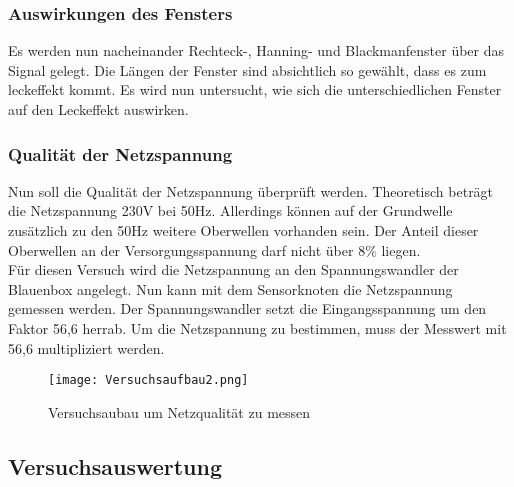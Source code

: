 \documentclass{article}%
\begin{document}
\subsubsection{Auswirkungen des Fensters}
Es werden nun nacheinander Rechteck-, Hanning- und Blackmanfenster über das Signal gelegt. Die Längen der Fenster sind absichtlich so gewählt, dass es zum leckeffekt kommt. Es wird nun untersucht, wie sich die unterschiedlichen Fenster auf den Leckeffekt auswirken. 
\subsubsection{Qualität der Netzspannung}
Nun soll die Qualität der Netzspannung überprüft werden. Theoretisch beträgt die Netzspannung 230V bei 50Hz. Allerdings können auf der Grundwelle zusätzlich zu den 50Hz weitere Oberwellen vorhanden sein. Der Anteil dieser Oberwellen an der Versorgungsspannung darf nicht über $8\%$ liegen.\\Für diesen Versuch wird die Netzspannung an den Spannungswandler der Blauenbox angelegt. Nun kann mit dem Sensorknoten die Netzspannung gemessen werden. Der Spannungswandler setzt die Eingangsspannung um den Faktor 56,6 herrab. Um die Netzspannung zu bestimmen, muss der Messwert mit 56,6 multipliziert werden.
\begin{figure}[htb]
\centering
\texttt{[image: Versuchsaufbau2.png]}
\caption{Versuchsaubau um Netzqualität zu messen}
\end{figure}
\subsection{Versuchsauswertung}
\end{document}
